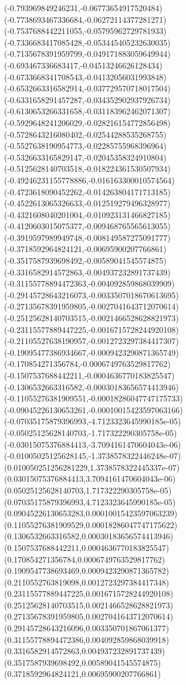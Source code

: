 {(-0.793969849246231,-0.06773654917520484)
(-0.7738693467336684,-0.06272114377281271)
(-0.7537688442211055,-0.05795962729781933)
(-0.7336683417085428,-0.053445405232630035)
(-0.7135678391959799,-0.049171883059649944)
(-0.693467336683417,-0.04513246626128434)
(-0.6733668341708543,-0.04132056031993848)
(-0.6532663316582914,-0.037729570718017504)
(-0.6331658291457287,-0.034352902937926734)
(-0.6130653266331658,-0.031183962462071307)
(-0.5929648241206029,-0.028216154772856498)
(-0.5728643216080402,-0.02544288535268755)
(-0.5527638190954773,-0.02285755968396964)
(-0.5326633165829147,-0.02045358324910804)
(-0.5125628140703518,-0.018224361530507934)
(-0.49246231155778886,-0.016163300010574564)
(-0.4723618090452262,-0.014263804171713185)
(-0.4522613065326633,-0.012519279496328977)
(-0.4321608040201004,-0.010923131466827185)
(-0.4120603015075377,-0.009468765565613055)
(-0.3919597989949748,-0.008149587275091777)
(-0.3718592964824121,-0.00695900207766861)
(-0.3517587939698492,-0.00589041545574875)
(-0.3316582914572863,-0.004937232891737439)
(-0.31155778894472363,-0.004092859868039909)
(-0.29145728643216073,-0.0033507018670613695)
(-0.27135678391959805,-0.0027041643712070614)
(-0.25125628140703515,-0.0021466528628821973)
(-0.23115577889447225,-0.0016715728244920108)
(-0.21105527638190957,-0.0012723297384417307)
(-0.19095477386934667,-0.0009423290871365749)
(-0.170854271356784,-0.0006749763529817762)
(-0.1507537688442211,-0.0004636770183825547)
(-0.1306532663316582,-0.00030183656574413946)
(-0.11055276381909551,-0.00018286047747175733)
(-0.09045226130653261,-0.00010015423597063166)
(-0.07035175879396993,-4.7123323645990185e-05)
(-0.05025125628140703,-1.717322290305758e-05)
(-0.03015075376884413,-3.7094161470604043e-06)
(-0.01005025125628145,-1.3738578322446248e-07)
(0.010050251256281229,1.3738578322445337e-07)
(0.03015075376884413,3.7094161470604043e-06)
(0.05025125628140703,1.717322290305758e-05)
(0.07035175879396993,4.7123323645990185e-05)
(0.09045226130653283,0.00010015423597063239)
(0.11055276381909529,0.00018286047747175622)
(0.1306532663316582,0.00030183656574413946)
(0.1507537688442211,0.0004636770183825547)
(0.170854271356784,0.0006749763529817762)
(0.1909547738693469,0.0009423290871365782)
(0.2110552763819098,0.0012723297384417348)
(0.23115577889447225,0.0016715728244920108)
(0.25125628140703515,0.0021466528628821973)
(0.27135678391959805,0.0027041643712070614)
(0.29145728643216096,0.003350701867061377)
(0.31155778894472386,0.004092859868039918)
(0.3316582914572863,0.004937232891737439)
(0.3517587939698492,0.00589041545574875)
(0.3718592964824121,0.00695900207766861)
}
